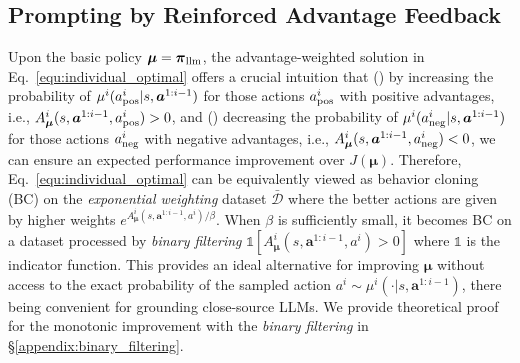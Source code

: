 \documentclass[11pt]{article}
\theoremstyle{plain}
\theoremstyle{remark}
\begin{document}
\subsection{Prompting by Reinforced Advantage Feedback} \label{section:3-3}
Upon the basic policy $\boldsymbol{\mu} = \boldsymbol{\pi}_{\rm llm}$, the advantage-weighted solution in Eq.~\eqref{equ:individual_optimal} offers a crucial intuition that
() by increasing the probability of $\mu^{i}(a^{i}_{\rm pos}|s,\boldsymbol{a}^{1:i-1})$ for those actions $a^{i}_{\rm pos}$ with positive advantages, i.e., $A_{\boldsymbol{\mu}}^{i}(s, \boldsymbol{a}^{1:i-1}, a^{i}_{\rm pos}) > 0$, and () decreasing the probability of $\mu^{i}(a^{i}_{\rm neg}|s,\boldsymbol{a}^{1:i-1})$ for those actions $a^{i}_{\rm neg}$ with negative advantages, i.e., $A_{\boldsymbol{\mu}}^{i}(s, \boldsymbol{a}^{1:i-1}, a^{i}_{\rm neg}) < 0$, we can ensure an expected performance improvement over $J(\boldsymbol{\mu})$.
Therefore, Eq.~\eqref{equ:individual_optimal} can be equivalently viewed as behavior cloning (BC) on the \emph{exponential weighting} dataset $\bar{\mathcal{D}}$ where the better actions are given by higher weights $e^ {A_{\boldsymbol{\mu}}^{i}(s, \boldsymbol{a}^{1:i-1}, a^{i}) / \beta}$.
When $\beta$ is sufficiently small, it becomes BC on a dataset processed by \emph{binary filtering} $\mathds{1}[A_{\boldsymbol{\mu}}^{i}(s, \boldsymbol{a}^{1:i-1}, a^{i}) > 0]$ where $\mathds{1}$ is the indicator function.
This provides an ideal alternative for improving $\boldsymbol{\mu}$ without access to the exact probability of the sampled action $a^i\sim \mu^i(\cdot|s,\boldsymbol{a}^{1:i-1})$, there being convenient for grounding close-source LLMs.
We provide theoretical proof for the monotonic improvement with the \emph{binary filtering} in \S\ref{appendix:binary_filtering}.
\end{document}
